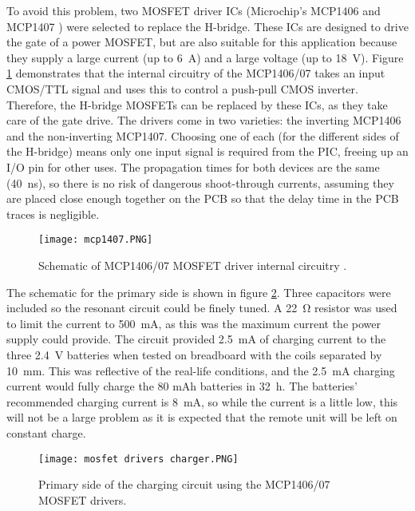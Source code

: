 To avoid this problem, two MOSFET driver ICs (Microchip's MCP1406 and MCP1407 \cite{mcp1407}) were selected to replace the H-bridge. These ICs are designed to drive the gate of a power MOSFET, but are also suitable for this application because they supply a large current (up to \SI{6}{\ampere}) and a large voltage (up to \SI{18}{\volt}). Figure \ref{fig: mcp1407} demonstrates that the internal circuitry of the MCP1406/07 takes an input CMOS/TTL signal and uses this to control a push-pull CMOS inverter. Therefore, the H-bridge MOSFETs can be replaced by these ICs, as they take care of the gate drive. The drivers come in two varieties: the inverting MCP1406 and the non-inverting MCP1407. Choosing one of each (for the different sides of the H-bridge) means only one input signal is required from the PIC, freeing up an I/O pin for other uses. The propagation times for both devices are the same (\SI{40}{\nano\second}), so there is no risk of dangerous shoot-through currents, assuming they are placed close enough together on the PCB so that the delay time in the PCB traces is negligible.\\

\begin{figure}[ht]
	\centering
	\texttt{[image: mcp1407.PNG]}
	\caption{Schematic of MCP1406/07 MOSFET driver internal circuitry \cite{mcp1407}.}
	\label{fig: mcp1407}
\end{figure}

The schematic for the primary side is shown in figure \ref{fig: mosfet drivers charger}. Three capacitors were included so the resonant circuit could be finely tuned. A \SI{22}{\ohm} resistor was used to limit the current to \SI{500}{\milli\ampere}, as this was the maximum current the power supply could provide. The circuit provided \SI{2.5}{\milli\ampere} of charging current to the three \SI{2.4}{\volt} batteries when tested on breadboard with the coils separated by \SI{10}{\milli\metre}. This was reflective of the real-life conditions, and the \SI{2.5}{\milli\ampere} charging current would fully charge the 80 mAh batteries in \SI{32}{\hour}. The batteries' recommended charging current is \SI{8}{\milli\ampere}, so while the current is a little low, this will not be a large problem as it is expected that the remote unit will be left on constant charge.\\

\begin{figure}[ht]
	\centering
	\texttt{[image: mosfet drivers charger.PNG]}
	\caption{Primary side of the charging circuit using the MCP1406/07 MOSFET drivers.}
	\label{fig: mosfet drivers charger}
\end{figure}

